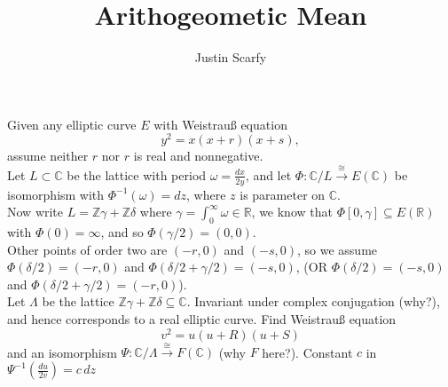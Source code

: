 \documentclass[12pt,reqno]{amsart}
\newcommand{\C}{\mathbb{C}}
\newcommand{\Z}{\mathbb{Z}}
\newcommand{\R}{\mathbb{R}}
\begin{document}
\title{Arithogeometic Mean}
\author{Justin Scarfy}
\maketitle

Given any elliptic curve $E$ with Weistrau{\ss}  equation
\[
y^2=x(x+r)(x+s),
\] 
assume neither $r$ nor $r$ is real and nonnegative.\\

Let $L \subset \C$ be the lattice with period $\omega = \frac{dx}{2y}$, and let $\Phi: \C/L \stackrel{\cong}{\longrightarrow} E(\C)$ be isomorphism with $\Phi^{-1}(\omega)=dz$, where $z$ is parameter on $\C$.\\

Now write $L=\Z\gamma+\Z\delta$ where $\gamma =\int_0^\infty \omega \in \R$, we know that $\Phi[0, \gamma] \subseteq E(\R)$ with $\Phi(0)=\infty$, and so $\Phi(\gamma /2)=(0, 0)$.\\

Other points of order two are $(-r, 0)$ and $(-s, 0)$, so we assume $\Phi(\delta /2)=(-r, 0)$ and $\Phi(\delta /2+\gamma/2)=(-s, 0)$, \Big(OR $\Phi(\delta /2)=(-s, 0)$ and $\Phi(\delta /2+\gamma/2)=(-r, 0)$\Big).\\

Let $\Lambda$ be the lattice $\Z \gamma+\Z \delta \subseteq \C$. Invariant under complex conjugation (why?), and hence corresponds to a real elliptic curve. Find Weistrau{\ss} equation 
\[
v^2=u(u+R)(u+S)
\]
and an isomorphism $\Psi: \C/\Lambda \stackrel{\cong}{\longrightarrow} F(\C)$ (why $F$ here?). Constant $c$ in $\Psi^{-1}(\frac{du}{2v})=c\,dz$
\end{document}
